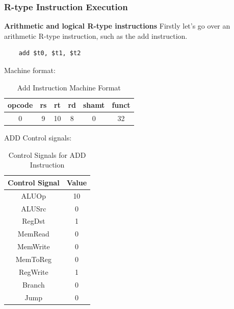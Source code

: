 \subsubsection{R-type Instruction Execution}

\textbf{Arithmetic and logical R-type instructions}\newline 
Firstly let's go over an arithmetic R-type instruction, such as the add instruction.
\begin{verbatim}
    add $t0, $t1, $t2
\end{verbatim}
Machine format:
\begin{table}[H]
    \centering
    \begin{tabular}{|c|c|c|c|c|c|}
    \hline
    \textbf{opcode} & \textbf{rs} & \textbf{rt} & \textbf{rd} & \textbf{shamt} & \textbf{funct} \\ \hline
    0             & 9          & 10         & 8          & 0            & 32            \\ \hline
    \end{tabular}
    \caption{Add Instruction Machine Format}
    \label{tab:add_instruction}
\end{table}

ADD Control signals:
\begin{table}[H]
    \centering
    \begin{tabular}{|c|c|}
    \hline
    \textbf{Control Signal} & \textbf{Value} \\ \hline
    ALUOp                   & 10             \\ \hline
    ALUSrc                  & 0             \\ \hline
    RegDst                  & 1             \\ \hline
    MemRead                 & 0             \\ \hline
    MemWrite                & 0             \\ \hline
    MemToReg                & 0             \\ \hline
    RegWrite                & 1             \\ \hline
    Branch                  & 0             \\ \hline
    Jump                 & 0             \\ \hline
    \end{tabular}
    \caption{Control Signals for ADD Instruction}
    \label{tab:add_control_signals}
\end{table}

